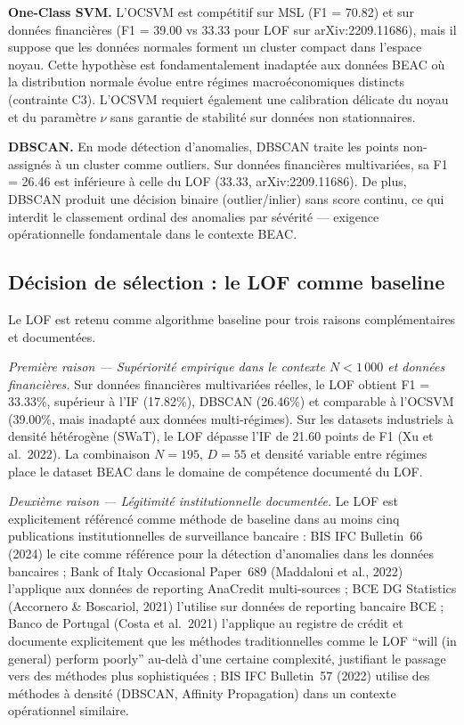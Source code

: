 \documentclass[12pt,a4paper]{article}
\begin{document}
\textbf{One-Class SVM.} L'OCSVM est compétitif sur MSL (F1 = 70.82) et sur
données financières (F1 = 39.00 vs 33.33 pour LOF sur arXiv:2209.11686), mais
il suppose que les données normales forment un cluster compact dans l'espace
noyau. Cette hypothèse est fondamentalement inadaptée aux données BEAC où la
distribution normale évolue entre régimes macroéconomiques distincts
(contrainte C3). L'OCSVM requiert également une calibration délicate du noyau
et du paramètre $\nu$ sans garantie de stabilité sur données non stationnaires.

\textbf{DBSCAN.} En mode détection d'anomalies, DBSCAN traite les points
non-assignés à un cluster comme outliers. Sur données financières multivariées,
sa F1 = 26.46 est inférieure à celle du LOF (33.33, arXiv:2209.11686). De
plus, DBSCAN produit une décision binaire (outlier/inlier) sans score continu,
ce qui interdit le classement ordinal des anomalies par sévérité --- exigence
opérationnelle fondamentale dans le contexte BEAC.

\subsection{Décision de sélection : le LOF comme baseline}

Le LOF est retenu comme algorithme baseline pour trois raisons complémentaires
et documentées.

\textit{Première raison --- Supériorité empirique dans le contexte
$N < 1\,000$ et données financières.} Sur données financières multivariées
réelles, le LOF obtient F1 = 33.33\%, supérieur à l'IF (17.82\%), DBSCAN
(26.46\%) et comparable à l'OCSVM (39.00\%, mais inadapté aux données
multi-régimes). Sur les datasets industriels à densité hétérogène (SWaT),
le LOF dépasse l'IF de 21.60 points de F1 (Xu et al.\ 2022). La combinaison
$N = 195$, $D = 55$ et densité variable entre régimes place le dataset BEAC
dans le domaine de compétence documenté du LOF.

\textit{Deuxième raison --- Légitimité institutionnelle documentée.} Le LOF
est explicitement référencé comme méthode de baseline dans au moins cinq
publications institutionnelles de surveillance bancaire : BIS IFC Bulletin~66
(2024) le cite comme référence pour la détection d'anomalies dans les données
bancaires ; Bank of Italy Occasional Paper~689 (Maddaloni et al., 2022) l'applique
aux données de reporting AnaCredit multi-sources ; BCE DG Statistics
(Accornero \& Boscariol, 2021) l'utilise sur données de reporting bancaire BCE ;
Banco de Portugal (Costa et al.\ 2021) l'applique au registre de crédit et
documente explicitement que les méthodes traditionnelles comme le LOF
``will (in general) perform poorly'' au-delà d'une certaine complexité, justifiant
le passage vers des méthodes plus sophistiquées ; BIS IFC Bulletin~57 (2022)
utilise des méthodes à densité (DBSCAN, Affinity Propagation) dans un contexte
opérationnel similaire.
\end{document}
